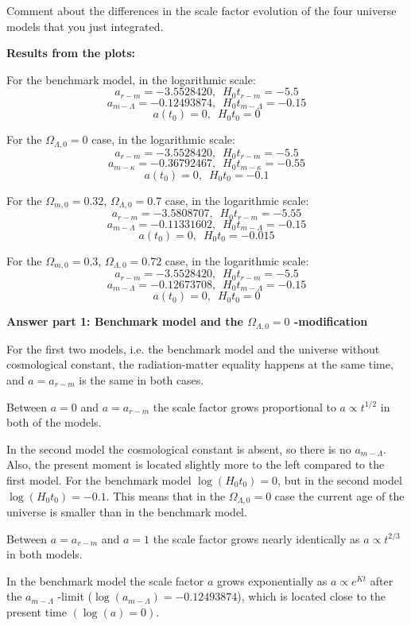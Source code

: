 \documentclass[a4paper,12pt]{article}
\begin{document}
\begin{itemize}
Comment about the differences in the scale factor evolution of the four universe models that you just integrated.

\vspace{0.5cm}
\textbf{Results from the plots:}

For the benchmark model, in the logarithmic scale:
$$a_{r-m}=-3.5528420, \,\,\, H_0 t_{r-m} = -5.5$$ 
$$a_{m-\Lambda}=-0.12493874, \,\,\, H_0 t_{m-\Lambda} = -0.15$$ 
$$a(t_0)=0, \,\,\, H_0 t_0 = 0$$

For the $\Omega_{\Lambda,0}=0$ case, in the logarithmic scale:
$$a_{r-m}=-3.5528420, \,\,\, H_0 t_{r-m} = -5.5$$ 
$$ a_{m-\kappa}=-0.36792467,  \,\,\, H_0 t_{m-\kappa} = -0.55$$ 
$$a(t_0)=0, \,\,\, H_0 t_0 = -0.1$$

For the $\Omega_{m,0}=0.32$, $\Omega_{\Lambda,0}=0.7$ case, in the logarithmic scale:
$$a_{r-m}=-3.5808707, \,\,\, H_0 t_{r-m} = -5.55$$
$$a_{m-\Lambda}=-0.11331602, \,\,\, H_0 t_{m-\Lambda} = -0.15$$
$$a(t_0)=0, \,\,\, H_0 t_0 = -0.015$$

For the $\Omega_{m,0}=0.3$, $\Omega_{\Lambda,0}=0.72$ case, in the logarithmic scale:
$$a_{r-m}=-3.5528420, \,\,\, H_0 t_{r-m} = -5.5$$
$$a_{m-\Lambda}=-0.12673708, \,\,\, H_0 t_{m-\Lambda} = -0.15$$ 
$$a(t_0)=0, \,\,\, H_0 t_0 = 0$$


\vspace{0.5cm}
\textbf{Answer part 1: Benchmark model and the $\Omega_{\Lambda,0}=0$ -modification}

For the first two models, i.e. the benchmark model and the universe without cosmological constant, the radiation-matter equality happens at the same time, and $a=a_{r-m}$ is the same in both cases.

Between $a=0$ and $a=a_{r-m}$ the scale factor grows proportional to $a \propto t^{1/2}$ in both of the models.

In the second model the cosmological constant is absent, so there is no $a_{m-\Lambda}$. Also, the present moment is located slightly more to the left compared to the first model. For the benchmark model $\log(H_0 t_0) = 0$, but in the second model $\log(H_0 t_0) = -0.1$. 
This means that in the $\Omega_{\Lambda,0}=0$ case the current age of the universe is smaller than in the benchmark model.

Between $a=a_{r-m}$ and $a=1$ the scale factor grows nearly identically as $a \propto t^{2/3}$ in both models.

In the benchmark model the scale factor $a$ grows exponentially as $a \propto e^{Kt}$ after the $a_{m-\Lambda}$ -limit ($\log(a_{m-\Lambda})=-0.12493874$), which is located close to the present time $(\log(a)=0)$. 


\end{itemize}
\end{document}
